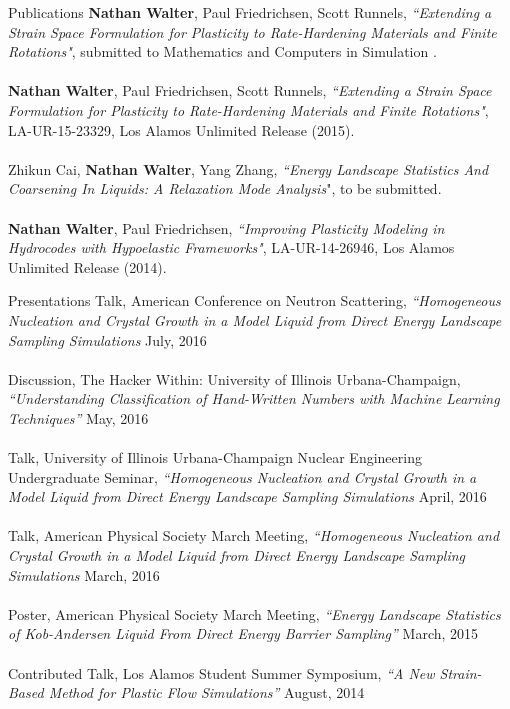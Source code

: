 \documentclass[10pt]{resume} %
\begin{document}
\begin{rSection}{Publications}
	{ \bf Nathan Walter}, Paul Friedrichsen, Scott Runnels, {\it{``Extending a Strain Space Formulation for Plasticity to Rate-Hardening Materials and Finite Rotations"}}, submitted to Mathematics and Computers in Simulation .
	\\
	\\
	{ \bf Nathan Walter}, Paul Friedrichsen, Scott Runnels, {\it{``Extending a Strain Space Formulation for Plasticity to Rate-Hardening Materials and Finite Rotations"}}, LA-UR-15-23329, Los Alamos Unlimited Release (2015).
	\\
	\\
	Zhikun Cai, {\bf Nathan Walter}, Yang Zhang, {\it ``Energy Landscape Statistics And Coarsening In Liquids: A Relaxation Mode Analysis}", to be submitted.
	\\
	\\
	{ \bf Nathan Walter}, Paul Friedrichsen, {\it{``Improving Plasticity Modeling in Hydrocodes with Hypoelastic Frameworks"}}, LA-UR-14-26946, Los Alamos Unlimited Release (2014).
	\\	
\end{rSection}

\begin{rSection}{Presentations}
	Talk, American Conference on Neutron Scattering, {\it{``Homogeneous Nucleation and Crystal Growth in a Model Liquid from Direct Energy Landscape Sampling Simulations}} \hfill {July, 2016}
	\\
	\\
	Discussion, The Hacker Within: University of Illinois Urbana-Champaign, {\it{``Understanding Classification of Hand-Written Numbers with Machine Learning Techniques''}} \hfill {May, 2016}
	\\
	\\
	Talk, University of Illinois Urbana-Champaign Nuclear Engineering Undergraduate Seminar, {\it{``Homogeneous Nucleation and Crystal Growth in a Model Liquid from Direct Energy Landscape Sampling Simulations}} \hfill {April, 2016} 
	\\
	\\
	Talk, American Physical Society March Meeting, {\it{``Homogeneous Nucleation and Crystal Growth in a Model Liquid from Direct Energy Landscape Sampling Simulations}} \hfill {March, 2016} \\
	\\
	Poster, American Physical Society March Meeting, {\it{``Energy Landscape Statistics of Kob-Andersen Liquid From Direct Energy Barrier Sampling''}} \hfill {March, 2015} \\
	\\	
	Contributed Talk, Los Alamos Student Summer Symposium, {\it{``A New Strain-Based Method for Plastic Flow Simulations''}} \hfill {August, 2014} \\
\end{rSection}
\end{document}
